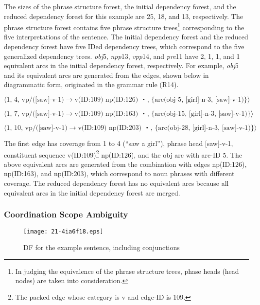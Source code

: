 \documentclass[english]{jnlp_1.4_rep}
\theoremstyle{break}
\theoremstyle{plain}
\theoremstyle{plain}
\begin{document}
The sizes of the phrase structure forest, the initial dependency
forest, and the reduced dependency forest for this example are 25, 18,
and 13, respectively. The phrase structure forest contains five phrase
structure trees\footnote{In judging the equivalence of the phrase
  structure trees, phase heads (head nodes) are taken into
  consideration.} corresponding to the five interpretations of the
sentence. The initial dependency forest and the reduced dependency
forest have five IDed dependency trees, which correspond to the five
generalized dependency trees. \textit{obj}5, \textit{npp}13, \textit{vpp}14, and \textit{pre}11
have 2, 1, 1, and 1 equivalent arcs in the initial dependency forest,
respectively. For example, \textit{obj}5 and its equivalent arcs are
generated from the edges, shown below in diagrammatic form, originated
in the grammar rule (R14).

$\langle\text{1, 4, vp/([saw]-v-1)} \rightarrow \text{v(ID:109) np(ID:126) ・, \{arc(obj-5, [girl]-n-3, [saw]-v-1)\}}\rangle$

$\langle\text{1, 7, vp/([saw]-v-1)} \rightarrow \text{v(ID:109) np(ID:163) ・, \{arc(obj-15, [girl]-n-3, [saw]-v-1)\}}\rangle$

$\langle\text{1, 10, vp/([saw]-v-1)} \rightarrow \text{v(ID:109) np(ID:203) ・, \{arc(obj-28, [girl]-n-3, [saw]-v-1)\}}\rangle$

\noindent
The first edge has coverage from 1 to 4 (``saw a girl''),
phrase head [saw]-v-1, constituent sequence v(ID:109)\footnote{The
  packed edge whose category is v and edge-ID is 109.} np(ID:126), and
the obj arc with arc-ID 5. The above equivalent arcs are generated
from the combination with edges np(ID:126), np(ID:163), and np(ID:203),
which correspond to noun phrases with different coverage. The reduced
dependency forest has no equivalent arcs because all equivalent arcs
in the initial dependency forest are merged.


\subsubsection{Coordination Scope Ambiguity}

\begin{figure}[b]
\begin{center}
\texttt{[image: 21-4ia6f18.eps]}
\end{center}
\caption{DF for the example sentence, including conjunctions}
\label{fig:DFForEarthAndMoonSec4}
\end{figure}
\end{document}
